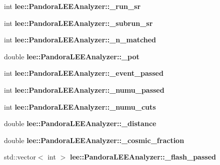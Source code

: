 \begin{DoxyCompactItemize}
\item 
\hypertarget{group__lee_gae9a94b51ad7618349eee1115c170679d}{int {\bfseries lee\-::\-Pandora\-L\-E\-E\-Analyzer\-::\-\_\-run\-\_\-sr}}\label{group__lee_gae9a94b51ad7618349eee1115c170679d}

\item 
\hypertarget{group__lee_gaba4424e8079da9de241fdd61d648a7f5}{int {\bfseries lee\-::\-Pandora\-L\-E\-E\-Analyzer\-::\-\_\-subrun\-\_\-sr}}\label{group__lee_gaba4424e8079da9de241fdd61d648a7f5}

\item 
\hypertarget{group__lee_ga49bf84147aebe0125c041e58ad39ea63}{int {\bfseries lee\-::\-Pandora\-L\-E\-E\-Analyzer\-::\-\_\-n\-\_\-matched}}\label{group__lee_ga49bf84147aebe0125c041e58ad39ea63}

\item 
\hypertarget{group__lee_gab9e2d69bbb1796181bfb0b73b3571327}{double {\bfseries lee\-::\-Pandora\-L\-E\-E\-Analyzer\-::\-\_\-pot}}\label{group__lee_gab9e2d69bbb1796181bfb0b73b3571327}

\item 
\hypertarget{group__lee_gae2220a696ef93026eca209bb981ffbdd}{int {\bfseries lee\-::\-Pandora\-L\-E\-E\-Analyzer\-::\-\_\-event\-\_\-passed}}\label{group__lee_gae2220a696ef93026eca209bb981ffbdd}

\item 
\hypertarget{group__lee_ga5358fd908f314be50f85ea97523fbca4}{int {\bfseries lee\-::\-Pandora\-L\-E\-E\-Analyzer\-::\-\_\-numu\-\_\-passed}}\label{group__lee_ga5358fd908f314be50f85ea97523fbca4}

\item 
\hypertarget{group__lee_ga50ca292dbf6464fa2845f4aed51f79b7}{int {\bfseries lee\-::\-Pandora\-L\-E\-E\-Analyzer\-::\-\_\-numu\-\_\-cuts}}\label{group__lee_ga50ca292dbf6464fa2845f4aed51f79b7}

\item 
\hypertarget{group__lee_ga67ddd5bec66667568bc59b0dfa13839a}{double {\bfseries lee\-::\-Pandora\-L\-E\-E\-Analyzer\-::\-\_\-distance}}\label{group__lee_ga67ddd5bec66667568bc59b0dfa13839a}

\item 
\hypertarget{group__lee_ga9d3deef73e6dd40b958cb4709ddea35c}{double {\bfseries lee\-::\-Pandora\-L\-E\-E\-Analyzer\-::\-\_\-cosmic\-\_\-fraction}}\label{group__lee_ga9d3deef73e6dd40b958cb4709ddea35c}

\item 
\hypertarget{group__lee_ga39d4c9760193a606cfdeb7af7195486c}{std\-::vector$<$ int $>$ {\bfseries lee\-::\-Pandora\-L\-E\-E\-Analyzer\-::\-\_\-flash\-\_\-passed}}\label{group__lee_ga39d4c9760193a606cfdeb7af7195486c}


\end{DoxyCompactItemize}
